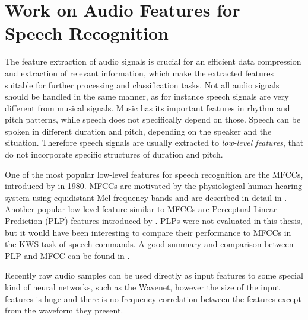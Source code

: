
\section{Work on Audio Features for Speech Recognition}\label{sec:prev_features}
The feature extraction of audio signals is crucial for an efficient data compression and extraction of relevant information, which make the extracted features suitable for further processing and classification tasks.
Not all audio signals should be handled in the same manner, as for instance speech signals are very different from musical signals.
Music has its important features in rhythm and pitch patterns, while speech does not specifically depend on those.
Speech can be spoken in different duration and pitch, depending on the speaker and the situation.
Therefore speech signals are usually extracted to \emph{low-level features}, that do not incorporate specific structures of duration and pitch.

One of the most popular low-level features for speech recognition are the MFCCs, introduced by \cite{Mermelstein1980} in 1980.
MFCCs are motivated by the physiological human hearing system using equidistant Mel-frequency bands and are described in detail in .
Another popular low-level feature similar to MFCCs are Perceptual Linear Prediction (PLP) features introduced by \cite{Hermansky1987}.
PLPs were not evaluated in this thesis, but it would have been interesting to compare their performance to MFCCs in the KWS task of speech commands.
A good summary and comparison between PLP and MFCC can be found in \cite{Hoenig2005}.

Recently raw audio samples can be used directly as input features to some special kind of neural networks, such as the Wavenet, however the size of the input features is huge and there is no frequency correlation between the features except from the waveform they present.